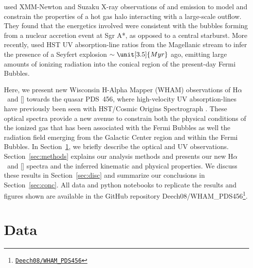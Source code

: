 \documentclass[twocolumn]{aastex63}
\newcommand{\nii}{\ion{N}{2}}
\newcommand{\ha}{H\ensuremath{\alpha}}
\begin{document}
\citet{Miller2016} used XMM-Newton and Suzaku X-ray observations of  and  emission to model and constrain the properties of a hot gas halo interacting with a large-scale outflow. They found that the energetics involved were consistent with the bubbles forming from a nuclear accretion event at Sgr A*, as opposed to a central starburst. More recently, \citet{JBH2019} used HST UV absorption-line ratios from the Magellanic stream to infer the presence of a Seyfert explosion $\sim \unit[3.5]{Myr}$ ago, emitting large amounts of ionizing radiation into the conical region of the present-day Fermi Bubbles.



Here, we present new Wisconsin H-Alpha Mapper (WHAM) observations of \ha\ and [\nii] towards the quasar PDS~456, where high-velocity UV absorption-lines have previously been seen with HST/Cosmic Origins Spectrograph \citep[COS][]{Fox2015}. These optical spectra provide a new avenue to constrain both the physical conditions of the ionized gas that has been associated with the Fermi Bubbles as well the radiation field emerging from the Galactic Center region and within the Fermi Bubbles. In Section~\ref{sec:data}, we briefly describe the optical and UV observations. Section~\ref{sec:methods} explains our analysis methods and  presents our new \ha\ and [\nii] spectra and the inferred kinematic and physical properties. We discuss these results in Section~\ref{sec:disc} and summarize our conclusions in Section~\ref{sec:conc}. 
All data and python notebooks to replicate the results and figures shown are available in the GitHub repository Deech08/WHAM\_PDS456\footnote{\href{https://github.com/Deech08/WHAM_PDS456}{\texttt{Deech08/WHAM\_PDS456}}}.


\section{Data} \label{sec:data}
\end{document}
